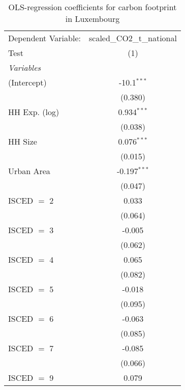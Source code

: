 
\begin{table}[htbp!]
   \centering
   \small
   \begin{adjustbox}{width = 1\textwidth, max height = 0.95\textheight, center}
      \begin{threeparttable}[b]
         \caption{\label{tab:OLS_2_LUX} OLS-regression coefficients for carbon footprint in Luxembourg}
         \begin{tabular}{lc}
            \tabularnewline \midrule \midrule
            Dependent Variable: & scaled\_CO2\_t\_national\\     
            Test                & (1)\\  
            \midrule
            \emph{Variables}\\
            (Intercept)         & -10.1$^{***}$\\   
                                & (0.380)\\   
            HH Exp. (log)       & 0.934$^{***}$\\   
                                & (0.038)\\   
            HH Size             & 0.076$^{***}$\\   
                                & (0.015)\\   
            Urban Area          & -0.197$^{***}$\\   
                                & (0.047)\\   
            ISCED $=$ 2         & 0.033\\   
                                & (0.064)\\   
            ISCED $=$ 3         & -0.005\\   
                                & (0.062)\\   
            ISCED $=$ 4         & 0.065\\   
                                & (0.082)\\   
            ISCED $=$ 5         & -0.018\\   
                                & (0.095)\\   
            ISCED $=$ 6         & -0.063\\   
                                & (0.085)\\   
            ISCED $=$ 7         & -0.085\\   
                                & (0.066)\\   
            ISCED $=$ 9         & 0.079\\   

\end{tabular}
\end{threeparttable}
\end{adjustbox}
\end{table}
